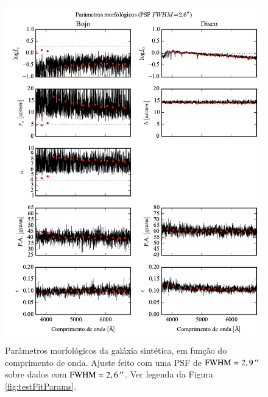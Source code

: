 \begin{figure}
	\includegraphics{figuras/simulation_fitparams_psf26}
	\caption[Parâmetros morfológicos (teste com PSF $\mathrm{FWHM} = 2,6\,\arcs$)]
	{Parâmetros morfológicos da galáxia sintética, em função do comprimento de
	onda. Ajuste feito com uma PSF de $\mathrm{FWHM} = 2,9\,^{\prime\prime}$ sobre
	dados com $\mathrm{FWHM} = 2,6\,\arcs$. Ver legenda da Figura
	\ref{fig:testFitParams}.}
	\label{fig:testFitParams26}
\end{figure}

